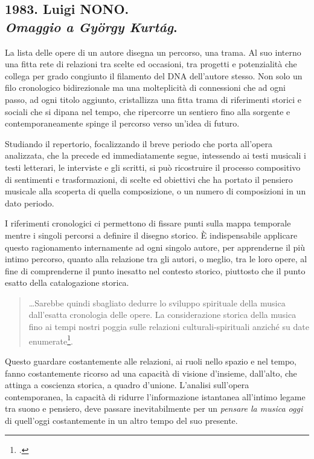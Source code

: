 \subsection*{1983. Luigi NONO.\\\emph{Omaggio a György Kurtág}.}

La lista delle opere di un autore disegna un percorso, una trama. Al suo interno una fitta rete di relazioni tra scelte ed occasioni, tra progetti e potenzialità che collega per grado congiunto il filamento del DNA dell'autore stesso. Non solo un filo cronologico bidirezionale ma una molteplicità di connessioni che ad ogni passo, ad ogni titolo aggiunto, cristallizza una fitta trama di riferimenti storici e sociali che si dipana nel tempo, che ripercorre un sentiero fino alla sorgente e contemporaneamente spinge il percorso verso un'idea di futuro.

Studiando il repertorio, focalizzando il breve periodo che porta all'opera analizzata, che la precede ed immediatamente segue, intessendo ai testi musicali i testi letterari, le interviste e gli scritti, si può ricostruire il processo compositivo di sentimenti e trasformazioni, di scelte ed obiettivi che ha portato il pensiero musicale alla scoperta di quella composizione, o un numero di composizioni in un dato periodo.

I riferimenti cronologici ci permettono di fissare punti sulla mappa temporale mentre i singoli percorsi a definire il disegno storico. È indispensabile applicare questo ragionamento internamente ad ogni singolo autore, per apprenderne il più intimo percorso, quanto alla relazione tra gli autori, o meglio, tra le loro opere, al fine di comprenderne il punto inesatto nel contesto storico, piuttosto che il punto esatto della catalogazione storica.

\begin{quote}
		\raggedright
		\ldots Sarebbe quindi sbagliato dedurre lo sviluppo spirituale della musica dall'esatta cronologia delle opere. La considerazione storica della musica fino ai tempi nostri poggia sulle relazioni culturali-spirituali anziché su date enumerate\footcite[pag. 2 ]{fleischer:mcont}.
\end{quote}

Questo guardare costantemente alle relazioni, ai ruoli nello spazio e nel tempo, fanno costantemente ricorso ad una capacità di visione d'insieme, dall'alto, che attinga a coscienza storica, a quadro d'unione. L'analisi sull'opera contemporanea, la capacità di ridurre l'informazione istantanea all'intimo legame tra suono e pensiero, deve passare inevitabilmente per un \emph{pensare la musica oggi} di quell'oggi costantemente in un altro tempo del suo presente.

